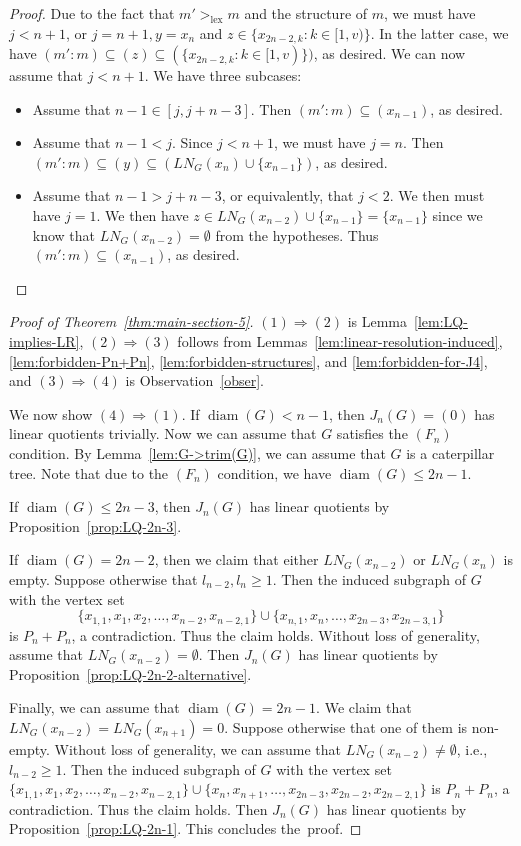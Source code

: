 \documentclass{amsart}
\theoremstyle{remark}
\theoremstyle{definition}
\DeclareMathOperator{\lex}{lex}
\DeclareMathOperator{\diam}{diam}
\begin{document}
\begin{proof}
		Due to the fact that $m'>_{\lex}  m$ and the structure of $m$, we must have $j<n+1$, or $j=n+1, y=x_{n}$ and $z\in \{x_{2n-2,k}\colon k\in [1,v)\}$. In the latter case, we have $(m'\colon m)\subseteq (z)\subseteq (\{x_{2n-2,k}\colon k\in [1,v)\})$, as desired. We can now assume that $j< n+1$. We have three subcases:
		\begin{itemize}
			\item Assume that $n-1\in [j,j+n-3]$. Then $(m'\colon m)\subseteq (x_{n-1})$, as desired.
			\item Assume that $n-1<j$. Since $j<n+1$, we must have $j=n$. Then  $(m'\colon m) \subseteq (y) \subseteq (LN_G(x_{n})\cup \{x_{n-1}\})$, as desired.
			\item Assume that $n-1>j+n-3$, or equivalently, that $j<2$. We then must have $j=1$. We then have $z\in LN_G(x_{n-2})\cup \{x_{n-1}\}= \{x_{n-1}\}$ since we know that $LN_G(x_{n-2})=\emptyset$ from the hypotheses. Thus $(m'\colon m)\subseteq (x_{n-1})$, as desired. \qedhere
		\end{itemize}
	\end{proof}
	
	
	
	\begin{proof}[Proof of Theorem~\ref{thm:main-section-5}]
		$(1)\Rightarrow (2)$ is Lemma~\ref{lem:LQ-implies-LR}, $(2)\Rightarrow (3)$ follows from Lemmas~\ref{lem:linear-resolution-induced}, \ref{lem:forbidden-Pn+Pn}, \ref{lem:forbidden-structures}, and \ref{lem:forbidden-for-J4}, and $(3)\Rightarrow (4)$ is Observation~\ref{obser}. 
        
        We now show $(4)\Rightarrow (1)$. If $\diam(G)<n-1$, then $J_n(G)=(0)$ has linear quotients trivially. Now we can assume that $G$ satisfies the $(F_n)$ condition. By Lemma~\ref{lem:G->trim(G)}, we can assume that $G$ is a caterpillar tree. Note that due to the $(F_n)$ condition, we have $\diam(G)\leq 2n-1$. 
        
        If $\diam(G)\leq 2n-3$, then $J_n(G)$ has linear quotients by Proposition~\ref{prop:LQ-2n-3}.
		
		If $\diam(G)=2n-2$, then we claim that  either $LN_G(x_{n-2})$ or $LN_G(x_{n})$ is empty. Suppose otherwise that $l_{n-2},l_{n}\geq 1$. Then the induced subgraph of $G$ with the vertex set \[
        \{x_{1,1}, x_{1},x_2, \dots, x_{n-2}, x_{n-2,1}\}\cup \{x_{n,1},x_{n},\dots, x_{2n-3},x_{2n-3,1}\}\]
        is $P_n+P_n$, a contradiction. Thus the claim holds. Without loss of generality, assume that $LN_G(x_{n-2})=\emptyset$. Then $J_n(G)$ has linear quotients by Proposition~\ref{prop:LQ-2n-2-alternative}.
		
		Finally, we can assume that $\diam(G)=2n-1$. We claim that $LN_G(x_{n-2})=LN_G(x_{n+1})=0$. Suppose otherwise that one of them is non-empty. Without loss of generality, we can assume that $LN_G(x_{n-2})\neq \emptyset$, i.e., $l_{n-2}\geq 1$. Then the induced subgraph of $G$ with the vertex set $\{x_{1,1},x_1, x_2, \dots, x_{n-2}, x_{n-2,1}\}\cup \{x_{n},x_{n+1},\dots, x_{2n-3},x_{2n-2},x_{2n-2,1}\}$ is $P_n+P_n$, a contradiction. Thus the claim holds. Then $J_n(G)$ has linear quotients by Proposition~\ref{prop:LQ-2n-1}. This concludes the~proof.
	\end{proof}
\end{document}

